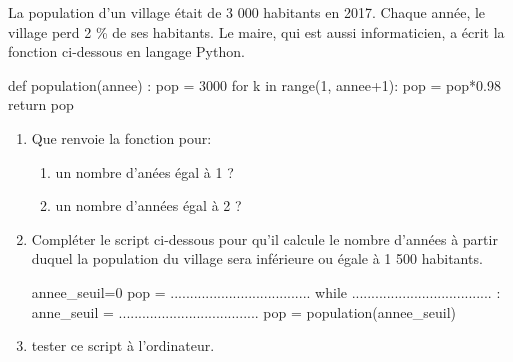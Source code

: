 \documentclass[a4paper,11pt,french]{article}
\begin{document}

\exo{}

La population d’un village était de 3 000 habitants en 2017. Chaque année, le village perd 2 \% de ses habitants. Le maire, qui est aussi informaticien, a écrit la fonction ci-dessous en langage Python.
\begin{pythoncode}
def population(annee) :
   pop = 3000
   for k in range(1, annee+1):
      pop = pop*0.98
   return pop
\end{pythoncode}

\begin{enumerate}[\bfseries 1.]
	\item 	Que renvoie la fonction  pour:
	\begin{enumerate}[\bfseries a.]
		\item 	un nombre d'anées égal à 1 ?
		\item 	un nombre d'années égal à 2 ?	
	\end{enumerate}
	\item 	Compléter le script ci-dessous pour qu’il calcule le nombre d’années à partir duquel la population du village sera inférieure ou égale à 1 500 habitants.
	\begin{pythoncode}
annee_seuil=0
pop = ....................................
while .................................... :
   anne_seuil = ....................................
   pop = population(annee_seuil)
	\end{pythoncode}
	\item tester ce script à l'ordinateur.
\end{enumerate}
\vspace{0.5cm}

\exo{}
\end{document}
